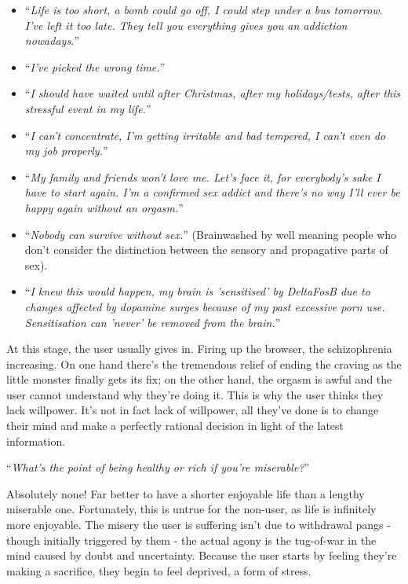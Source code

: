 \documentclass[
]{book}
\begin{document}
\begin{itemize}
\item
  ``\emph{Life is too short, a bomb could go off, I could step under a bus tomorrow. I've left it too late. They tell you everything gives you an addiction nowadays.}''
\item
  ``\emph{I've picked the wrong time.}''
\item
  ``\emph{I should have waited until after Christmas, after my holidays/tests, after this stressful event in my life.}''
\item
  ``\emph{I can't concentrate, I'm getting irritable and bad tempered, I can't even do my job properly.}''
\item
  ``\emph{My family and friends won't love me. Let's face it, for everybody's sake I have to start again. I'm a confirmed sex addict and there's no way I'll ever be happy again without an orgasm.}''
\item
  ``\emph{Nobody can survive without sex.}'' (Brainwashed by well meaning people who don't consider the distinction between the sensory and propagative parts of sex).
\item
  ``\emph{I knew this would happen, my brain is 'sensitised' by DeltaFosB due to changes affected by dopamine surges because of my past excessive porn use. Sensitisation can 'never' be removed from the brain.}''
\end{itemize}

At this stage, the user usually gives in. Firing up the browser, the schizophrenia increasing. On one hand there's the tremendous relief of ending the craving as the little monster finally gets its fix; on the other hand, the orgasm is awful and the user cannot understand why they're doing it. This is why the user thinks they lack willpower. It's not in fact lack of willpower, all they've done is to change their mind and make a perfectly rational decision in light of the latest information.

``\emph{What's the point of being healthy or rich if you're miserable?}''

Absolutely none! Far better to have a shorter enjoyable life than a lengthy miserable one. Fortunately, this is untrue for the non-user, as life is infinitely more enjoyable. The misery the user is suffering isn't due to withdrawal pangs - though initially triggered by them - the actual agony is the tug-of-war in the mind caused by doubt and uncertainty. Because the user starts by feeling they're making a sacrifice, they begin to feel deprived, a form of stress.
\end{document}
